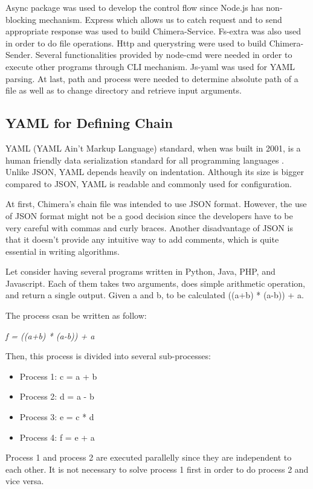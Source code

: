 \documentclass[conference]{IEEEtran}
\begin{document}
Async package was used to develop the control flow since Node.js has non-blocking
mechanism. Express which allows us to catch request
and to send appropriate response was used to build Chimera-Service. Fs-extra was also used in order to do file operations.
Http and querystring were used to build Chimera-Sender. Several functionalities
provided by node-cmd were needed in order to execute other programs through CLI mechanism.
Js-yaml was used for YAML parsing. At last, path and process were needed to determine 
absolute path of a file as well as to change directory and retrieve input arguments.

\subsection{YAML for Defining Chain}

YAML (YAML Ain't Markup Language) standard, when was built in 2001, is a human friendly data serialization standard for 
all programming languages \cite{yaml}. Unlike JSON,
YAML depends heavily on indentation. Although its size is bigger compared to JSON, YAML
is readable and commonly used for configuration.

At first, Chimera's chain file was intended to use JSON format. However, the use of JSON format might not be a good decision since the developers have to be very 
careful with commas and curly braces. Another disadvantage
of JSON is that it doesn't provide any intuitive way to add comments, which is quite
essential in writing algorithms.

Let consider having several programs written in Python, Java, PHP, and Javascript. 
Each of them takes two arguments, does simple arithmetic operation, and return a single output. 
Given a and b, to be calculated ((a+b) * (a-b)) + a.

The process csan be written as follow:

{\it f = ((a+b) * (a-b)) + a}

Then, this process is divided into several sub-processes:

\begin{itemize}
    \item Process 1: c = a + b
    \item Process 2: d = a - b
    \item Process 3: e = c * d
    \item Process 4: f = e + a
\end{itemize}

Process 1 and process 2 are executed parallelly since they are independent to each other. 
It is not necessary to solve process 1 first in order to do process 2 and vice versa.
\end{document}
